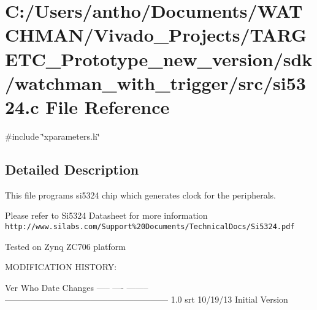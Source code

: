 \section{C\+:/\+Users/antho/\+Documents/\+W\+A\+T\+C\+H\+M\+A\+N/\+Vivado\+\_\+\+Projects/\+T\+A\+R\+G\+E\+T\+C\+\_\+\+Prototype\+\_\+new\+\_\+version/sdk/watchman\+\_\+with\+\_\+trigger/src/si5324.c File Reference}
\label{si5324_8c}
{\ttfamily \#include \char`\"{}xparameters.\+h\char`\"{}}\newline


\subsection{Detailed Description}
This file programs si5324 chip which generates clock for the peripherals.

Please refer to Si5324 Datasheet for more information {\texttt{ http\+://www.\+silabs.\+com/\+Support\%20\+Documents/\+Technical\+Docs/\+Si5324.\+pdf}}

Tested on Zynq Z\+C706 platform


\begin{DoxyPre}
MODIFICATION HISTORY:\end{DoxyPre}



\begin{DoxyPre}Ver   Who  Date  Changes
----- ---- -------- ---------------------------------------------------------
1.0   srt  10/19/13 Initial Version\end{DoxyPre}



\begin{DoxyPre}\end{DoxyPre}
 